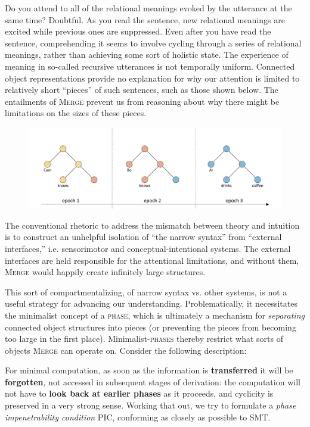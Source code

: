   Do you attend to all of the relational meanings evoked by the utterance at the same time? Doubtful. As you read the sentence, new relational meanings are excited while previous ones are suppressed. Even after you have read the sentence, comprehending it seems to involve cycling through a series of relational meanings, rather than achieving some sort of holistic state. The experience of meaning in so-called recursive utterances is not temporally uniform. Connected object representations provide no explanation for why our attention is limited to relatively short “pieces” of such sentences, such as those shown below. The entailments of \textsc{Merge} prevent us from reasoning about why there might be limitations on the sizes of these pieces.

  
\begin{figure}
\includegraphics[width=\textwidth]{figures/Tilsen-img111.png}
\caption{\missingcaption}
\label{fig:}
\end{figure}
 

  The conventional rhetoric to address the mismatch between theory and intuition is to construct an unhelpful isolation of “the narrow syntax” from “external interfaces,” i.e. sensorimotor and conceptual-intentional systems. The external interfaces are held responsible for the attentional limitations, and without them, \textsc{Merge} would happily create infinitely large structures. 

  This sort of compartmentalizing, of narrow syntax vs. other systems, is not a useful strategy for advancing our understanding. Problematically, it necessitates the minimalist concept of a \textsc{phase}, which is ultimately a mechanism for \textit{separating} connected object structures into pieces (or preventing the pieces from becoming too large in the first place). Minimalist-\textsc{phases} thereby restrict what sorts of objects \textsc{Merge} can operate on. Consider the following description:

For minimal computation, as soon as the information is \textbf{transferred} it will be \textbf{forgotten}, not accessed in subsequent stages of derivation: the computation will not have to \textbf{look back at earlier phases} as it proceeds, and cyclicity is preserved in a very strong sense. Working that out, we try to formulate a \textit{phase \textit{impenetrability} condition} PIC, conforming as closely as possible to SMT. \citep{Chomsky2008}

